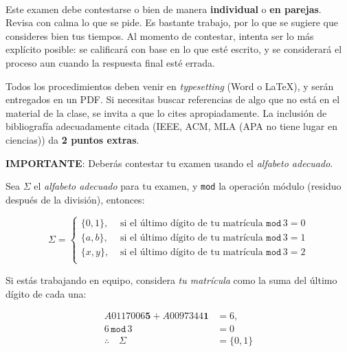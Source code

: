 \documentclass[8pt, onside]{article}
\title{
    \myclass \\
    \textbf{\mytitle} \\
    \myheader
    \date{}
}
\begin{document}
\maketitle

\vspace{-1.5cm}

Este examen debe contestarse o bien de manera \textbf{individual} o \textbf{en parejas}.
Revisa con calma lo que se pide. Es bastante trabajo, por lo que se sugiere que consideres bien tus tiempos.
Al momento de contestar, intenta ser lo más explícito posible: se calificará con base en lo que esté escrito, y se considerará el proceso aun cuando la respuesta final esté errada.

\vspace{1.5ex}

Todos los procedimientos deben venir en \textit{typesetting} (Word o \LaTeX), y serán entregados en un PDF.
Si necesitas buscar referencias de algo que no está en el material de la clase, se invita a que lo cites apropiadamente.
La inclusión de bibliografía adecuadamente citada (IEEE, ACM, MLA {\tiny (APA no tiene lugar en ciencias)}) da \textbf{2 puntos extras}.

\vspace{1.5ex}

\textbf{IMPORTANTE}: Deberás contestar tu examen usando el \textit{alfabeto adecuado}.

\vspace{1.5ex}

Sea $\Sigma$ el \textit{alfabeto adecuado} para tu examen, y \texttt{mod} la operación módulo (residuo después de la división), entonces:

$$ \Sigma = 
\begin{cases}
   \{0,1\}, & \text{ si el último dígito de tu matrícula } \mathtt{mod} \, 3 = 0 \\
   \{a,b\}, & \text{ si el último dígito de tu matrícula } \mathtt{mod} \, 3 = 1 \\
   \{x,y\}, & \text{ si el último dígito de tu matrícula } \mathtt{mod} \, 3 = 2 \\
\end{cases}
$$

Si estás trabajando en equipo, considera \textit{tu matrícula} como la suma del último dígito de cada una:

\begin{align*}
    A0117006\mathbf{5} + A0097344\mathbf{1} & =  6, \\
    6 \, \mathtt{mod} \, 3 & = 0 \\
    \therefore \quad \Sigma & = \{0,1\}
\end{align*}
\end{document}
